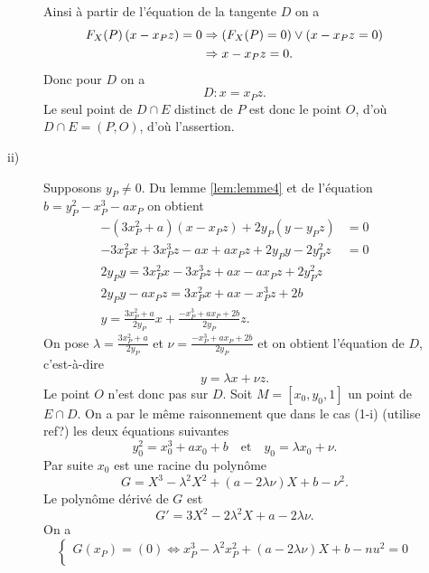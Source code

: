 \begin{demonstration}
\begin{description}
\begin{description}
                Ainsi à partir de l'équation de la tangente $D$ on a
                \begin{align*}
                    F_{X}(P)\left( x - x_Pz \right) = 0 &\Rightarrow \left( F_{X}(P) = 0\right) \vee \left( x - x_Pz = 0 \right) \\
                                                        &\Rightarrow x - x_Pz = 0
                .\end{align*}
                Donc pour $D$ on a 
                \[
                D : x = x_Pz
                .\] 
                Le seul point de $D \cap E$ distinct de $P$ est donc le point $O$, d'où $D \cap E = \left( P,O \right)$, d'où l'assertion.
            \item[ii)] Supposons $y_P \neq 0$. Du lemme \ref{lem:lemme4}  et de l'équation $b = y_P^2 - x_P^3 - ax_P$ on obtient
                \begin{align*}
                    - \left( 3x_P^2 + a \right) \left( x - x_Pz \right) + 2y_P\left( y - y_Pz \right) &= 0 \\
                    - 3x_P^2x + 3 x_P^3z - ax + ax_Pz + 2y_Py - 2y_P^2z &= 0 \\
                    2y_Py = 3x_P^2x - 3x_P^3z + ax - ax_Pz +2y_P^2z \\
                    2y_Py - ax_Pz = 3x_P^2x + ax - x_P^3z + 2b \\
                    y = \frac{3x_P^2 + a}{2y_P}x + \frac{- x_P^3 + ax_P + 2b}{2y_P}z
                .\end{align*}
                On pose $\lambda = \frac{3x_P^2 + a}{2y_P}$ et $\nu = \frac{- x_P^3 + ax_P + 2b}{2y_P}$ et on obtient l'équation de $D$, c'est-à-dire
                \[
                y = \lambda x + \nu z
                .\] 
                Le point $O$ n'est donc pas sur $D$. Soit $M = \left[ x_0, y_0, 1 \right]$ un point de $E \cap D$. On a par le même raisonnement que dans le cas (1-i) (utilise ref?) les deux équations suivantes
                \[
                y_0^2 = x_0^3 + ax_0 + b \quad \text{et} \quad y_0 = \lambda x_0 + \nu
                .\] 
                Par suite $x_0$ est une racine du polynôme
                \[
                G = X^3 - \lambda^2 X^2 + \left( a - 2\lambda\nu  \right)X + b - \nu^2
                .\] 
                Le polynôme dérivé de $G$ est
                \[
                G' = 3X^2 - 2\lambda^2 X + a - 2\lambda\nu
                .\] 
                On a
                \[
                    \begin{cases}
                G(x_P)=(0) \iff x_P^3-\lambda^2x_P^2+\left( a-2\lambda\nu \right)X+b-nu^2=0 \\

\end{cases}\]
\end{description}
\end{description}
\end{demonstration}
